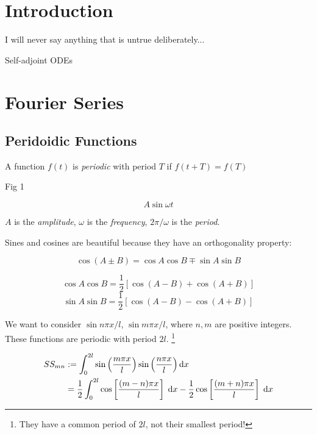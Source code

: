 \documentclass[a4paper]{article}
\begin{document}
\maketitle

\setcounter{section}{-1}
\section{Introduction}

I will never say anything that is untrue deliberately...

Self-adjoint ODEs

\section{Fourier Series}

\subsection{Peridoidic Functions}

\begin{defi}
	A function $ f(t) $ is \emph{periodic} with period $ T $ if $ f(t + T) = f(T) $
\end{defi}

Fig 1

\begin{eg}
	 \[ A \sin \omega t   \]
	
	$ A  $ is the \emph{amplitude}, $ \omega $ is the \emph{frequency}, $ 2 \pi / \omega $ is the \emph{period}.
\end{eg}

Sines and cosines are beautiful because they have an orthogonality property:

\[ \cos(A \pm B) = \cos A \cos B \mp \sin A \sin B \]


\[ \cos A \cos B = \frac{1}{2} \left[  \cos (A - B) + \cos(A + B) \right] \]
\[ \sin A \sin B = \frac{1}{2} \left[  \cos (A - B) - \cos(A + B) \right] \]

We want to consider $ \sin n\pi x / l $, $ \sin m \pi x / l $, where $ n, m $ are positive integers. These functions are periodic with period $ 2l $. \footnote{They have a common period of $ 2l $, not their smallest period!}



\begin{align*}
SS_{mn} & : = \int_{0}^{2l} \sin \left( \frac{m \pi x}{l} \right) \sin \left( \frac{n \pi x}{l} \right) \mathrm{d} x \\
& = \frac{1}{2} \int_{0}^{2l} \cos \left[  \frac{(m-n) \pi x}{l} \right]  \; \mathrm{d} x - \frac{1}{2} \cos \left[  \frac{(m+n) \pi x}{l} \right] \; \mathrm{d} x 
\end{align*}
\end{document}

